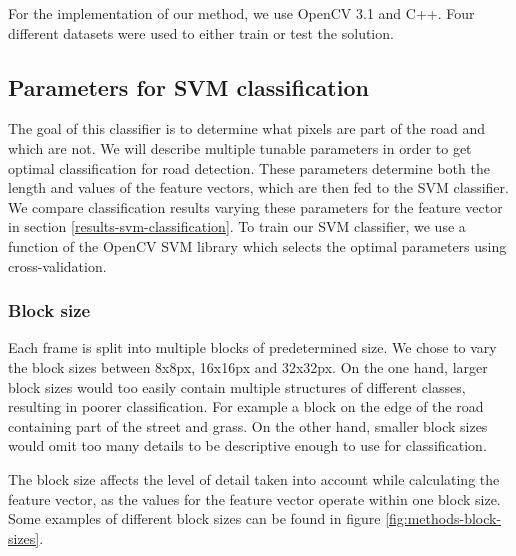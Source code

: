 \documentclass[runningheads,a4paper]{llncs}
\begin{document}
For the implementation of our method, we use OpenCV 3.1 \cite{Bradski2000} and C++. Four different datasets were used to either train or test the solution.

\subsection{Parameters for SVM classification}\label{parameters-classification}
The goal of this classifier is to determine what pixels are part of the road and which are not. We will describe multiple tunable parameters in order to get optimal classification for road detection. These parameters determine both the length and values of the feature vectors, which are then fed to the SVM classifier. We compare classification results varying these parameters for the feature vector in section \ref{results-svm-classification}. To train our SVM classifier, we use a function of the OpenCV SVM library which selects the optimal parameters using cross-validation.

\subsubsection{Block size}
Each frame is split into multiple blocks of predetermined size. We chose to vary the block sizes between 8x8px, 16x16px and 32x32px. On the one hand, larger block sizes would too easily contain multiple structures of different classes, resulting in poorer classification. For example a block on the edge of the road containing part of the street and grass. On the other hand, smaller block sizes would omit too many details to be descriptive enough to use for classification.

The block size affects the level of detail taken into account while calculating the feature vector, as the values for the feature vector operate within one block size. Some examples of different block sizes can be found in figure \ref{fig:methods-block-sizes}.
\end{document}
